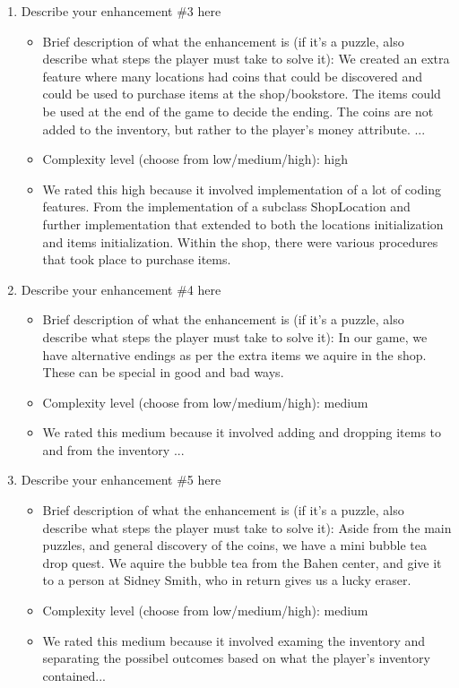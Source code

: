 \documentclass[11pt]{article}
\begin{document}
\begin{enumerate}
\item Describe your enhancement \#3 here
	\begin{itemize}
	\item Brief description of what the enhancement is (if it's a puzzle, also describe what steps the player must take to solve it): We created an extra feature where many locations had coins that could be discovered and could be used to purchase items at the shop/bookstore. The items could be used at the end of the game to decide the ending. The coins are not added to the inventory, but rather to the player's money attribute. ...
	\item Complexity level (choose from low/medium/high): high
	\item  We rated this high because it involved implementation of a lot of coding features. From the implementation of a subclass ShopLocation and further implementation that extended to both the locations initialization and items initialization. Within the shop, there were various procedures that took place to purchase items. 
	\end{itemize}
 
\item Describe your enhancement \#4 here
	\begin{itemize}
	\item Brief description of what the enhancement is (if it's a puzzle, also describe what steps the player must take to solve it): In our game, we have alternative endings as per the extra items we aquire in the shop. These can be special in good and bad ways. 
	\item Complexity level (choose from low/medium/high): medium
	\item  We rated this medium because it involved adding and dropping items to and from the inventory ...
	\end{itemize}
 
\item Describe your enhancement \#5 here
	\begin{itemize}
	\item Brief description of what the enhancement is (if it's a puzzle, also describe what steps the player must take to solve it): Aside from the main puzzles, and general discovery of the coins, we have a mini bubble tea drop quest. We aquire the bubble tea from the Bahen center, and give it to a person at Sidney Smith, who in return gives us a lucky eraser.
	\item Complexity level (choose from low/medium/high): medium
	\item  We rated this medium because it involved examing the inventory and separating the possibel outcomes based on what the player's inventory contained...
	\end{itemize}
 


\end{enumerate}
\end{document}
